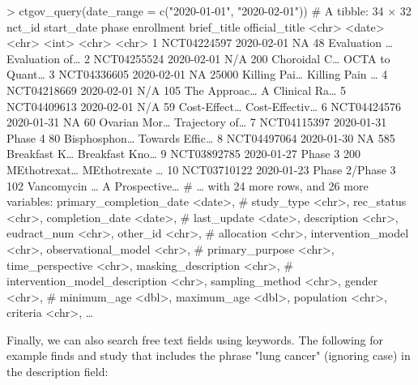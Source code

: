 \begin{example}
> ctgov_query(date_range = c("2020-01-01", "2020-02-01"))
# A tibble: 34 × 32
   nct_id      start_date phase           enrollment brief_title  official_title
   <chr>       <date>     <chr>                <int> <chr>        <chr>
 1 NCT04224597 2020-02-01 NA                      48 Evaluation … Evaluation of…
 2 NCT04255524 2020-02-01 N/A                    200 Choroidal C… OCTA to Quant…
 3 NCT04336605 2020-02-01 NA                   25000 Killing Pai… Killing Pain …
 4 NCT04218669 2020-02-01 N/A                    105 The Approac… A Clinical Ra…
 5 NCT04409613 2020-02-01 N/A                     59 Cost-Effect… Cost-Effectiv…
 6 NCT04424576 2020-01-31 NA                      60 Ovarian Mor… Trajectory of…
 7 NCT04115397 2020-01-31 Phase 4                 80 Bisphosphon… Towards Effic…
 8 NCT04497064 2020-01-30 NA                     585 Breakfast K… Breakfast Kno…
 9 NCT03892785 2020-01-27 Phase 3                200 MEthotrexat… MEthotrexate …
10 NCT03710122 2020-01-23 Phase 2/Phase 3        102 Vancomycin … A Prospective…
# … with 24 more rows, and 26 more variables: primary_completion_date <date>,
#   study_type <chr>, rec_status <chr>, completion_date <date>,
#   last_update <date>, description <chr>, eudract_num <chr>, other_id <chr>,
#   allocation <chr>, intervention_model <chr>, observational_model <chr>,
#   primary_purpose <chr>, time_perspective <chr>, masking_description <chr>,
#   intervention_model_description <chr>, sampling_method <chr>, gender <chr>,
#   minimum_age <dbl>, maximum_age <dbl>, population <chr>, criteria <chr>, …
\end{example}

Finally, we can also search free text fields using keywords. The following for
example finds and study that includes the phrase "lung cancer" (ignoring
case) in the description field:

